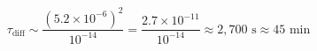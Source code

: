 \documentclass[preview]{standalone}
\begin{document}
\[\tau_\text{diff} \sim \frac{(5.2 \times 10^{-6})^2}{10^{-14}} = \frac{2.7 \times 10^{-11}}{10^{-14}} \approx 2{,}700 \text{ s} \approx 45 \text{ min}\]
\end{document}
